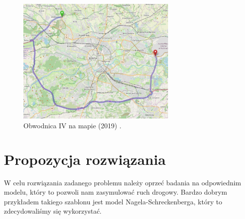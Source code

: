 \documentclass[a4paper,12pt]{article}
\begin{document}
	
	
	\begin{figure}
		\centering
		\includegraphics[width=0.7\textwidth]{openstreet.jpg}
		\caption{Obwodnica IV na mapie (2019) \cite{map}.}
	\end{figure}
	
	\section{Propozycja rozwiązania}
		
	W celu rozwiązania zadanego problemu należy oprzeć badania na odpowiednim modelu, który to pozwoli nam zasymulować ruch drogowy. Bardzo dobrym przykładem takiego szablonu jest model Nagela-Schreckenberga, który to zdecydowaliśmy się wykorzystać.
	
\end{document}

